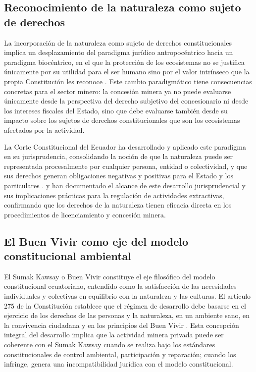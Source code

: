 \subsection{Reconocimiento de la naturaleza como sujeto de derechos}

La incorporación de la naturaleza como sujeto de derechos constitucionales implica un desplazamiento del paradigma jurídico antropocéntrico hacia un paradigma biocéntrico, en el que la protección de los ecosistemas no se justifica únicamente por su utilidad para el ser humano sino por el valor intrínseco que la propia Constitución les reconoce \parencite{ochoa_jimenez_2024}. Este cambio paradigmático tiene consecuencias concretas para el sector minero: la concesión minera ya no puede evaluarse únicamente desde la perspectiva del derecho subjetivo del concesionario ni desde los intereses fiscales del Estado, sino que debe evaluarse también desde su impacto sobre los sujetos de derechos constitucionales que son los ecosistemas afectados por la actividad.

La Corte Constitucional del Ecuador ha desarrollado y aplicado este paradigma en su jurisprudencia, consolidando la noción de que la naturaleza puede ser representada procesalmente por cualquier persona, entidad o colectividad, y que sus derechos generan obligaciones negativas y positivas para el Estado y los particulares \parencite{cce_1149_19_jp_21}. \textcite{lozano_espinosa_2023} y \textcite{peck_et_al_2024} han documentado el alcance de este desarrollo jurisprudencial y sus implicaciones prácticas para la regulación de actividades extractivas, confirmando que los derechos de la naturaleza tienen eficacia directa en los procedimientos de licenciamiento y concesión minera.

\subsection{El Buen Vivir como eje del modelo constitucional ambiental}

El Sumak Kawsay o Buen Vivir constituye el eje filosófico del modelo constitucional ecuatoriano, entendido como la satisfacción de las necesidades individuales y colectivas en equilibrio con la naturaleza y las culturas. El artículo 275 de la Constitución establece que el régimen de desarrollo debe basarse en el ejercicio de los derechos de las personas y la naturaleza, en un ambiente sano, en la convivencia ciudadana y en los principios del Buen Vivir \parencite{cre_2008}. Esta concepción integral del desarrollo implica que la actividad minera privada puede ser coherente con el Sumak Kawsay cuando se realiza bajo los estándares constitucionales de control ambiental, participación y reparación; cuando los infringe, genera una incompatibilidad jurídica con el modelo constitucional.

